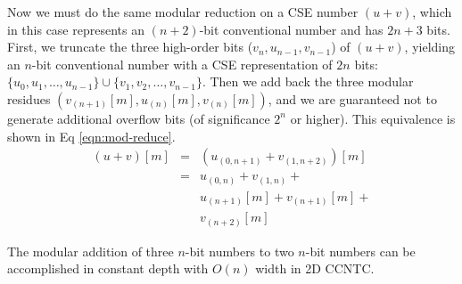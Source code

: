 Now we must do the same modular reduction on a CSE number $(u+v)$,
which in this case represents an $(n+2)$-bit conventional number and has
$2n+3$ bits.
%
%
First, we truncate the three high-order bits ($v_{n}, u_{n-1}, v_{n-1}$)
of $(u+v)$, yielding an $n$-bit
conventional number with a CSE representation of $2n$ bits:
$\{u_0, u_1, \ldots, u_{n-1}\} \cup \{v_1, v_2, \ldots, v_{n-1}\}$.
Then we add back the three modular residues
$(v_{(n+1)}[m], u_{(n)}[m], v_{(n)}[m])$, and we are guaranteed not to
generate additional overflow bits (of significance $2^{n}$ or higher). This equivalence
is shown in Eq \ref{eqn:mod-reduce}.
\begin{eqnarray}
(u+v)[m] &=& \left(u_{(0,n+1)} + v_{(1,n+2)}\right)[m] \nonumber \\
 &=& u_{(0,n)} +
     v_{(1,n)} + \nonumber \\
 & & u_{(n+1)}[m] +
     v_{(n+1)}[m] + \nonumber \\
 & & v_{(n+2)}[m]
\label{eqn:mod-reduce}
\end{eqnarray}

\begin{lemma}
The modular addition of three $n$-bit numbers to two $n$-bit numbers can be
accomplished
in constant depth with $O(n)$ width in \textsc{2D CCNTC}.
\end{lemma}

